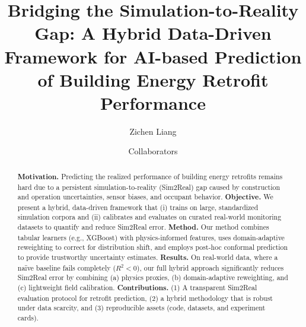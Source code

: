 ﻿\documentclass{article}
\title{Bridging the Simulation-to-Reality Gap: A Hybrid Data-Driven Framework for AI-based Prediction of Building Energy Retrofit Performance}
\author{Zichen Liang \and Collaborators}
\date{}
\begin{document}
\maketitle

\begin{abstract}
\textbf{Motivation.} Predicting the realized performance of building energy retrofits remains hard due to a persistent simulation-to-reality (Sim2Real) gap caused by construction and operation uncertainties, sensor biases, and occupant behavior.
\textbf{Objective.} We present a hybrid, data-driven framework that (i) trains on large, standardized simulation corpora and (ii) calibrates and evaluates on curated real-world monitoring datasets to quantify and reduce Sim2Real error.
\textbf{Method.} Our method combines tabular learners (e.g., XGBoost) with physics-informed features, uses domain-adaptive reweighting to correct for distribution shift, and employs post-hoc conformal prediction to provide trustworthy uncertainty estimates.
\textbf{Results.} On real-world data, where a na\"ive baseline fails completely ($R^2 < 0$), our full hybrid approach significantly reduces Sim2Real error by combining (a) physics proxies, (b) domain-adaptive reweighting, and (c) lightweight field calibration.
\textbf{Contributions.} (1) A transparent Sim2Real evaluation protocol for retrofit prediction, (2) a hybrid methodology that is robust under data scarcity, and (3) reproducible assets (code, datasets, and experiment cards).
\end{abstract}
\end{document}
